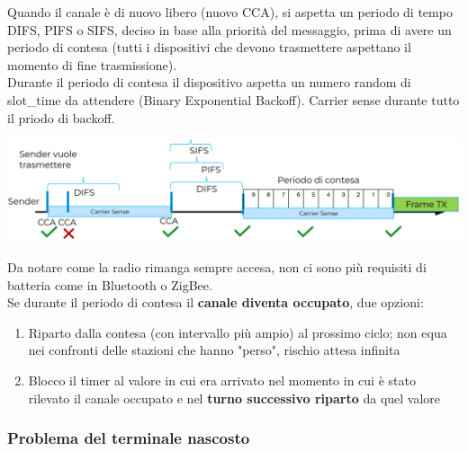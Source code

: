 Quando il canale è di nuovo libero (nuovo CCA), si aspetta un periodo di tempo DIFS, PIFS o SIFS, deciso in base alla priorità del messaggio, prima di avere un periodo di contesa (tutti i dispositivi che devono trasmettere aspettano il momento di fine trasmissione).\\
Durante il periodo di contesa il dispositivo aspetta un numero random di slot\_time da attendere (Binary Exponential Backoff). Carrier sense durante tutto il priodo di backoff.
\begin{center}
	\includegraphics[width=0.98\linewidth]{img/wlan/occupied1}
\end{center}

Da notare come la radio rimanga sempre accesa, non ci sono più requisiti di batteria come in Bluetooth o ZigBee.\\

Se durante il periodo di contesa il \textbf{canale diventa occupato}, due opzioni:
\begin{enumerate}
	\item Riparto dalla contesa (con intervallo più ampio) al prossimo ciclo; non equa nei confronti delle stazioni che hanno "perso", rischio attesa infinita
	\item Blocco il timer al valore in cui era arrivato nel momento in cui è stato rilevato il canale occupato e nel \textbf{turno successivo riparto} da quel valore
\end{enumerate}


\newpage

\subsubsection{Problema del terminale nascosto}

